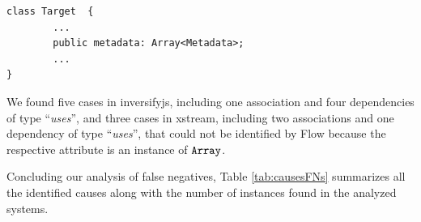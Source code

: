 \documentclass[review]{elsarticle}
\newcommand{\aspas}[1]{{``#1''}}
\newcommand{\mcode}[1]{$\tt #1$}
\begin{document}
\begin{lstlisting}[caption=TypeScript implementation of a class that has an attribute of type \mcode{Array<Metadata>},  label=lst_ts_array_inversifyjs, emph={[2]Metadata},emphstyle={[2]\ttfamily\bfseries\color{darkgreen}}]
class Target  {
		...
		public metadata: Array<Metadata>;
		...
}
\end{lstlisting} 

We found five cases in {\sc inversifyjs}, including one association and four dependencies of type \aspas{\textit{uses}}, and three cases in {\sc xstream}, including two associations and one dependency of type \aspas{\textit{uses}}, that could not be identified by Flow because the respective attribute is an instance of \mcode{Array}. 

Concluding our analysis of false negatives, Table \ref{tab:causesFNs} summarizes all the identified causes along with the number of instances found in the analyzed systems. 
\end{document}
